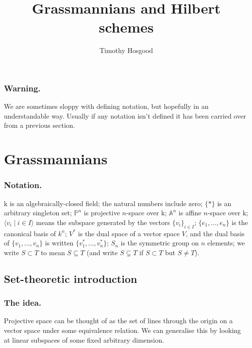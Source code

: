 \documentclass[10pt]{article}
\title{Grassmannians and Hilbert schemes}
\author{Timothy Hosgood}
\numberwithin{equation}{subsubsection}
\renewcommand{\P}{\mathbb{P}}
\newcommand{\A}{\mathbb{A}}
\renewcommand{\k}{\mathrm{k}}
\begin{document}
    
    
    \maketitle
    \tableofcontents

    \subsubsection{Warning.} We are sometimes sloppy with defining notation, but hopefully in an understandable way. Usually if any notation isn't defined it has been carried over from a previous section.
                
    \section{Grassmannians}
    
            \subsubsection{Notation.} $\k$ is an algebraically-closed field; the natural numbers include zero; $\{*\}$ is an arbitrary singleton set; $\P^n$ is projective $n$-space over $\k$; $\A^n$ is affine $n$-space over $\k$; $\langle v_i \mid i\in I\rangle$ means the subspace generated by the vectors $\{v_i\}_{i\in I}$; $\{e_1,\ldots,e_n\}$ is the canonical basis of $k^n$; $V^*$ is the dual space of a vector space $V$, and the dual basis of $\{v_1,\ldots,v_n\}$ is written $\{v_1^*,\ldots,v_n^*\}$; $S_n$ is the symmetric group on $n$ elements; we write $S\subset T$ to mean $S\subseteq T$ (and write $S\subsetneq T$ if $S\subset T$ but $S\neq T$).

        \subsection{Set-theoretic introduction}
        
            \subsubsection{The idea.} Projective space can be thought of as the set of lines through the origin on a vector space under some equivalence relation. We can generalise this by looking at linear subspaces of some fixed arbitrary dimension.
        
\end{document}
